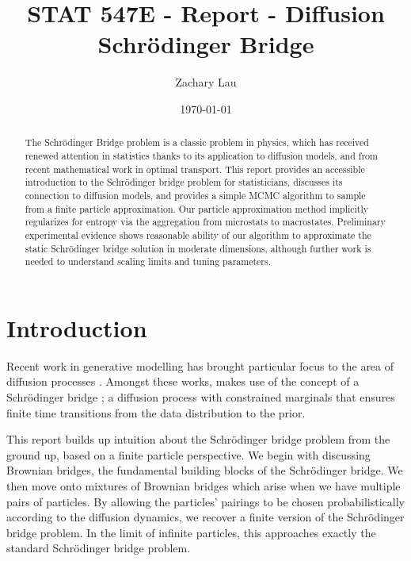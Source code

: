 \documentclass{article}
\begin{document}
\title{STAT 547E - Report - Diffusion Schrödinger Bridge}
\author{Zachary Lau}
\date{\today}
\maketitle

\begin{abstract}
The Schrödinger Bridge problem is a classic problem in physics, which has
received renewed attention in statistics thanks to its application to diffusion
models, and from recent mathematical work in optimal transport. This report
provides an accessible introduction to the Schrödinger bridge problem for
statisticians, discusses its connection to diffusion models, and provides a
simple MCMC algorithm to sample from a finite particle approximation.  Our
particle approximation method implicitly regularizes for entropy via the
aggregation from microstats to macrostates. Preliminary experimental evidence
shows reasonable ability of our algorithm to approximate the static Schrödinger
bridge solution in moderate dimensions, although further work is
needed to understand scaling limits and tuning parameters.  \end{abstract}

\section{Introduction}
Recent work in generative modelling has brought particular focus to the area
of diffusion processes
\cite{ho2020denoisingdiffusionprobabilisticmodels}
\cite{song2020generativemodelingestimatinggradients}. Amongst these works,
\cite{debortoli2023diffusionschrodingerbridgeapplications}
makes use of the concept of a Schrödinger bridge
\cite{Schrodinger1932}; a diffusion process with
constrained marginals that ensures finite time transitions from the data
distribution to the prior.

This report builds up intuition about the Schrödinger bridge problem from the
ground up, based on a finite particle perspective.
We begin with discussing Brownian bridges, the fundamental building blocks of
the Schrödinger bridge.  We then move onto mixtures of Brownian bridges which
arise when we have multiple pairs of particles. By allowing the particles'
pairings to be chosen probabilistically according to the diffusion dynamics, we
recover a finite version of the Schrödinger bridge problem. In the limit of
infinite particles, this approaches exactly the standard Schrödinger bridge
problem.
\end{document}
